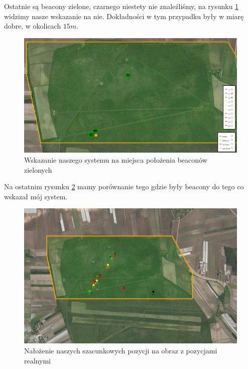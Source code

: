 Ostatnie są beacony zielone, czarnego niestety nie znaleźliśmy, na rysunku \ref{fig:wskazaniezielone} widzimy nasze wskazanie na nie. Dokładności w tym przypadku były w miarę dobre, w okolicach $15 m$.

\begin{figure}[!th]
    \centering
    \includegraphics[width=15cm]{zalaczniki/obrazy/wskazanie_zielone.png}
    \caption{Wskazanie naszego systemu na miejsca położenia beaconów zielonych}
    \label{fig:wskazaniezielone}
\end{figure}

Na ostatnim rysunku \ref{fig:beaconykonkursowenasze} mamy porównanie tego gdzie były beacony do tego co wskazał mój system.

\begin{figure}[!th]
    \centering
    \includegraphics[width=15cm]{zalaczniki/obrazy/beacony_konkursowe_nasze.png}
    \caption{Nałożenie naszych szacunkowych pozycji na obraz z pozycjami realnymi}
    \label{fig:beaconykonkursowenasze}
\end{figure}

